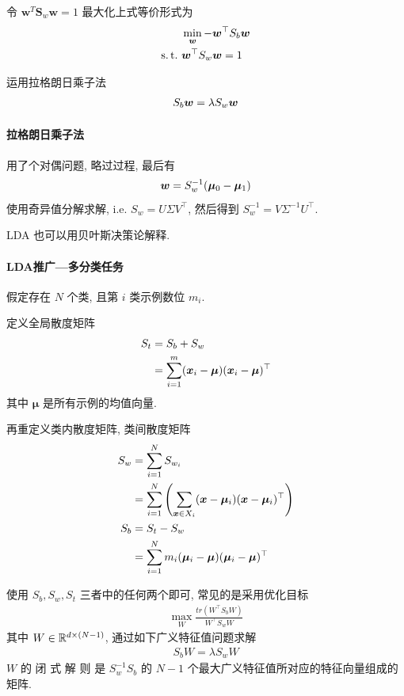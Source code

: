令 $\bm w ^T \bm S_w \bm w=1$ 最大化上式等价形式为
\begin{align*}
    &\min_{\bw} -\bw^\top S_b \bw\\
    \st & \bw^\top S_w \bw=1
\end{align*}

运用拉格朗日乘子法
\begin{align*}
    S_b\bm{w}=\lambda S_w\bm{w}
\end{align*}

\paragraph{拉格朗日乘子法}
用了个对偶问题, 略过过程, 最后有
\begin{align*}
    \bm{w}=S_w^{-1}(\bm{\mu}_0-\bm{\mu}_1)
\end{align*}
使用奇异值分解求解, i.e. $S_w=U\Sigma V^\top$, 然后得到 $S_w^{-1}=V\Sigma^{-1}U^\top$.

LDA 也可以用贝叶斯决策论解释. 

\paragraph{LDA推广---多分类任务}假定存在 $N$ 个类, 且第 $i$ 类示例数位 $m_i$.

定义全局散度矩阵
\begin{align*}
    S_t&=S_b+S_w\\
    &=\sum_{i=1}^m (\bm{x}_i-\bm\mu)(\bm{x}_i-\bm\mu)^\top
\end{align*}
其中 $\bm\mu$ 是所有示例的均值向量. 

再重定义类内散度矩阵, 类间散度矩阵
\begin{align*}
    S_w&=\sum_{i=1}^N S_{w_i}\\
    &=\sum_{i=1}^N \left( \sum_{\bm{x}\in X_i}(\bm{x}-\bm{\mu}_i)(\bm{x}-\bm{\mu}_i)^\top \right)\\
    S_b&=S_t-S_w\\
    &=\sum_{i=1}^N m_i(\bm{\mu}_i-\bm\mu)(\bm{\mu}_i-\bm\mu)^\top
\end{align*}

使用 $S_b, S_w, S_t$ 三者中的任何两个即可, 常见的是采用优化目标
\begin{align*}
    \max_W\frac{tr(W^\top S_b W)}{W^\top S_w W}
\end{align*}
其中 $W\in\mathbb{R}^{d\times(N-1)}$, 通过如下广义特征值问题求解
\begin{align*}
    S_bW=\lambda S_w W
\end{align*}
$W$ 的 闭 式 解 则 是 $S_w^{-1}S_b$ 的 $N - 1$ 个最大广义特征值所对应的特征向量组成的矩阵.

